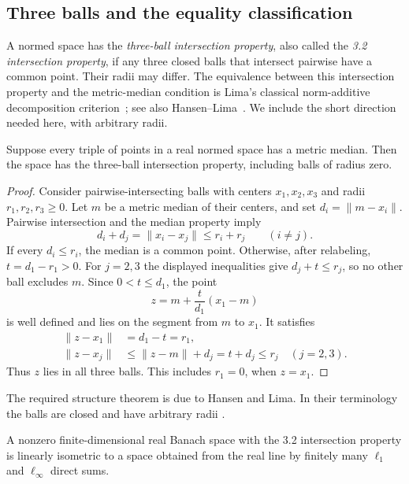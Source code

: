 \subsection{Three balls and the equality classification}

A normed space has the \emph{three-ball intersection property}, also
called the \emph{3.2 intersection property}, if any three closed balls
that intersect pairwise have a common point. Their radii may differ. The equivalence between this intersection
property and the metric-median condition is Lima's classical
norm-additive decomposition criterion~\cite[Theorem~1.2]{Lima1978};
see also Hansen--Lima~\cite[Theorem~3.6(4)]{HansenLima1981}. We include the
short direction needed here, with arbitrary radii.

\begin{lemma}\label{lem:three-balls}
Suppose every triple of points in a real normed space has a metric
median. Then the space has the three-ball intersection property,
including balls of radius zero.
\end{lemma}

\begin{proof}
Consider pairwise-intersecting balls with centers $x_1,x_2,x_3$ and
radii $r_1,r_2,r_3\ge0$. Let $m$ be a metric median of their centers,
and set $d_i=\|m-x_i\|$. Pairwise intersection and the median property
imply
\[
 d_i+d_j=\|x_i-x_j\|\le r_i+r_j
 \qquad(i\ne j).
\]
If every $d_i\le r_i$, the median is a common point. Otherwise,
after relabeling, $t=d_1-r_1>0$. For $j=2,3$ the displayed inequalities
give $d_j+t\le r_j$, so no other ball excludes $m$. Since
$0<t\le d_1$, the point
\[
 z=m+\frac{t}{d_1}(x_1-m)
\]
is well defined and lies on the segment from $m$ to $x_1$. It satisfies
\[
 \begin{aligned}
 \|z-x_1\|&=d_1-t=r_1,\\
 \|z-x_j\|&\le\|z-m\|+d_j=t+d_j\le r_j\quad(j=2,3).
 \end{aligned}
\]
Thus $z$ lies in all three balls. This includes $r_1=0$, when $z=x_1$.
\end{proof}

The required structure theorem is due to Hansen and Lima. In their
terminology the balls are closed and have arbitrary radii
\cite[Section~1]{HansenLima1981}.

\begin{theorem}\label{thm:hansen-lima}
A nonzero finite-dimensional real Banach space with the 3.2 intersection
property is linearly isometric to a space obtained from the real line
by finitely many $\ell_1$ and $\ell_\infty$ direct sums.
\end{theorem}


